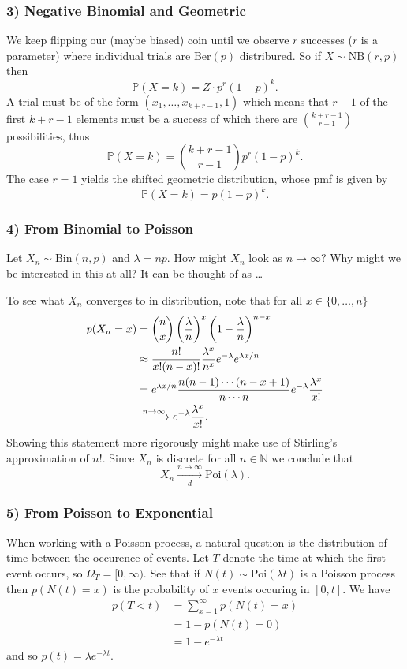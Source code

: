 \documentclass[11pt]{article}
\begin{document}
\begin{appendices}
\subsubsection*{3) Negative Binomial and Geometric}
We keep flipping our (maybe biased) coin until we observe $r$ successes ($r$ is a parameter) where individual trials are Ber$(p)$ distribured. So if $X\sim\text{NB}(r,p)$ then
$$
\mathbb{P}(X=k)
=
Z\cdot p^r(1-p)^k.
$$
A trial must be of the form $(x_1,\dots,x_{k+r-1},1)$ which means that $r-1$ of the first $k+r-1$ elements must be a success of which there are $\binom{k+r-1}{r-1}$ possibilities, thus
$$
\mathbb{P}(X=k)
=
\binom{k+r-1}{r-1}p^r(1-p)^k.
$$
The case $r=1$ yields the shifted geometric distribution, whose pmf is given by
$$
\mathbb{P}(X=k)
=
p(1-p)^k.
$$

\subsubsection*{4) From Binomial to Poisson}
Let $X_n\sim\text{Bin}(n,p)$ and $\lambda=np$. How might $X_n$ look as $n\to\infty$? Why might we be interested in this at all? It can be thought of as \dots

To see what $X_n$ converges to in distribution, note that for all $x\in\{0,\dots,n\}$
\begin{align*}
    p(X_n=x)
    &=
    \binom{n}{x}\left(\frac{\lambda}{n}\right)^x\left(1-\frac{\lambda}{n}\right)^{n-x}\\
    &\approx
    \frac{n!}{x!(n-x)!}\frac{\lambda^x}{n^x}e^{-\lambda}e^{\lambda x/n}\\
    &=
    e^{\lambda x/n}\frac{n(n-1)\cdots(n-x+1)}{n\cdots n}e^{-\lambda}\frac{\lambda^x}{x!}\\
    & \xrightarrow{n\to\infty}
    e^{-\lambda}\frac{\lambda^x}{x!}.
\end{align*}
Showing this statement more rigorously might make use of Stirling's approximation of $n!$. Since $X_n$ is discrete for all $n\in\mathbb{N}$ we conclude that
$$
X_n
\xrightarrow[d]{n\to\infty}
\text{Poi}(\lambda).
$$

\subsubsection*{5) From Poisson to Exponential}
When working with a Poisson process, a natural question is the distribution of time between the occurence of events. Let $T$ denote the time at which the first event occurs, so $\Omega_T=[0,\infty)$. See that if $N(t)\sim\text{Poi}(\lambda t)$ is a Poisson process then $p(N(t)=x)$ is the probability of $x$ events occuring in $[0,t]$. We have
\begin{align*}
    p(T<t)
    &=
    \sum_{x=1}^{\infty}p(N(t)=x)\\
    &=
    1-p(N(t)=0)\\
    &=
    1-e^{-\lambda t}
\end{align*}
and so
$p(t)=\lambda e^{-\lambda t}$.


\end{appendices}
\end{document}

